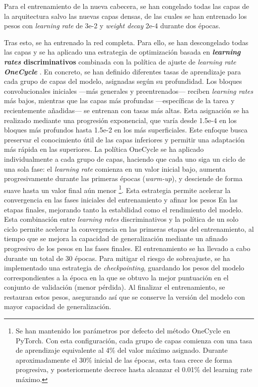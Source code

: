 Para el entrenamiento de la nueva cabecera, se han congelado todas las capas de la arquitectura salvo las nuevas capas densas, de las cuales se han entrenado los pesos con \textit{learning rate} de 3e-2 y \textit{weight decay} 2e-4 durante dos épocas.

Tras esto, se ha entrenado la red completa. Para ello, se han descongelado todas las capas y se ha aplicado una estrategia de optimización basada en \textbf{\textit{learning rates} discriminativos} combinada con la política de ajuste de \textit{learning rate \textbf{OneCycle}} \cite{smith2018}.
En concreto, se han definido diferentes tasas de aprendizaje para cada grupo de capas del modelo, asignadas según su profundidad. Los bloques convolucionales iniciales ---más generales y preentrenados--- reciben \textit{learning rates} más bajos, mientras que las capas más profundas ---específicas de la tarea y recientemente añadidas--- se entrenan con tasas más altas. Esta asignación se ha realizado mediante una progresión exponencial, que varía desde 1.5e-4 en los bloques más profundos hasta 1.5e-2 en los más superficiales. Este enfoque busca preservar el conocimiento útil de las capas inferiores y permitir una adaptación más rápida en las superiores.
La política OneCycle se ha aplicado individualmente a cada grupo de capas, haciendo que cada uno siga un ciclo de una sola fase: el \textit{learning rate} comienza en un valor inicial bajo, aumenta progresivamente durante las primeras épocas (\textit{warm-up}), y desciende de forma suave hasta un valor final aún menor%
\footnote{
    Se han mantenido los parámetros por defecto del método OneCycle en PyTorch. Con esta configuración, cada grupo de capas comienza con una tasa de aprendizaje equivalente al 4\% del valor máximo asignado. Durante aproximadamente el 30\% inicial de las épocas, esta tasa crece de forma progresiva, y posteriormente decrece hasta alcanzar el 0.01\% del learning rate máximo.
}. 
Esta estrategia permite acelerar la convergencia en las fases iniciales del entrenamiento y afinar los pesos En las etapas finales, mejorando tanto la estabilidad como el rendimiento del modelo.
Esta combinación entre \textit{learning rates} discriminativos y la política de un solo ciclo permite acelerar la convergencia en las primeras etapas del entrenamiento, al tiempo que se mejora la capacidad de generalización mediante un afinado progresivo de los pesos en las fases finales.
El entrenamiento se ha llevado a cabo durante un total de 30 épocas. Para mitigar el riesgo de sobreajuste, se ha implementado una estrategia de \textit{checkpointing}, guardando los pesos del modelo correspondientes a la época en la que se obtuvo la mejor puntuación en el conjunto de validación (menor pérdida). Al finalizar el entrenamiento, se restauran estos pesos, asegurando así que se conserve la versión del modelo con mayor capacidad de generalización.

